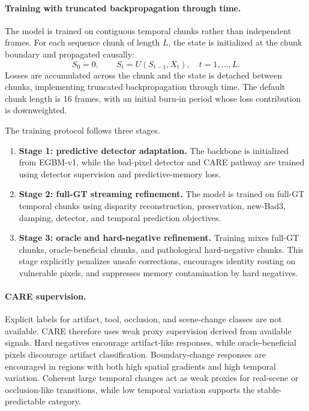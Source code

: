 \documentclass[11pt,a4paper]{article}
\begin{document}
\paragraph{Training with truncated backpropagation through time.}
The model is trained on contiguous temporal chunks rather than independent
frames. For each sequence chunk of length $L$, the state is initialized at the
chunk boundary and propagated causally:
\begin{equation}
    S_0 = 0,
    \qquad
    S_t =
    U
    \left(
        S_{t-1},
        X_t
    \right),
    \quad
    t=1,\ldots,L.
\end{equation}
Losses are accumulated across the chunk and the state is detached between
chunks, implementing truncated backpropagation through time. The default chunk
length is 16 frames, with an initial burn-in period whose loss contribution is
downweighted.

The training protocol follows three stages.

\begin{enumerate}
    \item \textbf{Stage 1: predictive detector adaptation.}
    The backbone is initialized from EGBM-v1, while the bad-pixel detector and
    CARE pathway are trained using detector supervision and predictive-memory
    loss.

    \item \textbf{Stage 2: full-GT streaming refinement.}
    The model is trained on full-GT temporal chunks using disparity reconstruction,
    preservation, new-Bad3, damping, detector, and temporal prediction objectives.

    \item \textbf{Stage 3: oracle and hard-negative refinement.}
    Training mixes full-GT chunks, oracle-beneficial chunks, and pathological
    hard-negative chunks. This stage explicitly penalizes unsafe corrections,
    encourages identity routing on vulnerable pixels, and suppresses memory
    contamination by hard negatives.
\end{enumerate}

\paragraph{CARE supervision.}
Explicit labels for artifact, tool, occlusion, and scene-change classes are not
available. CARE therefore uses weak proxy supervision derived from available
signals. Hard negatives encourage artifact-like responses, while
oracle-beneficial pixels discourage artifact classification. Boundary-change
responses are encouraged in regions with both high spatial gradients and high
temporal variation. Coherent large temporal changes act as weak proxies for
real-scene or occlusion-like transitions, while low temporal variation supports
the stable-predictable category.
\end{document}
